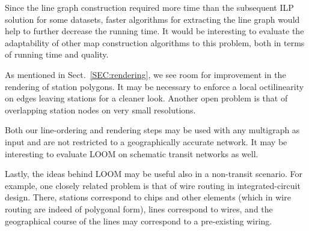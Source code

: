 \documentclass[sigconf]{acmart}
\newcommand\TODO[1]{\textcolor{blue}{\small [TODO: #1]}}
\begin{document}
Since the line graph construction required more time than the subsequent ILP solution for some datasets, faster algorithms for extracting the line graph would help to further decrease the running time. It would be interesting to evaluate the adaptability of other map construction algorithms to this problem, both in terms of running time and quality.

As mentioned in Sect.~\ref{SEC:rendering}, we see room for improvement in the rendering of station polygons. It may be necessary to enforce a local octilinearity on edges leaving stations for a cleaner look. Another open problem is that of overlapping station nodes on very small resolutions.

Both our line-ordering and rendering steps may be used with any multigraph as input and are not restricted to a geographically accurate network. It may be interesting to evaluate LOOM on schematic transit networks as well.

Lastly, the ideas behind LOOM may be useful also in a non-transit scenario.
For example, one closely related problem is that of wire routing in integrated-circuit design.
There, stations correspond to chips and other elements (which in wire routing are indeed of polygonal form), lines correspond to wires, and the geographical course of the lines may correspond to a pre-existing wiring.


%
%
%



\end{document}

